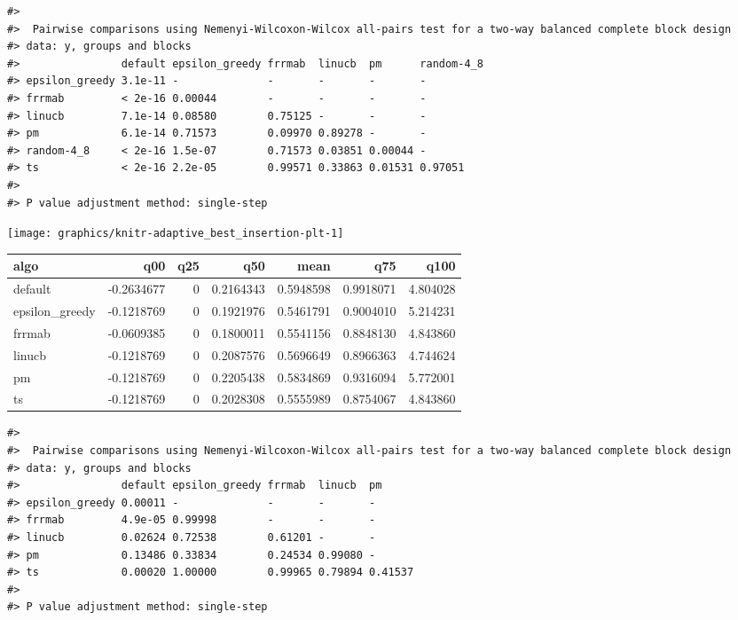\documentclass[
]{article}
\begin{document}
\begin{verbatim}
#> 
#>  Pairwise comparisons using Nemenyi-Wilcoxon-Wilcox all-pairs test for a two-way balanced complete block design
#> data: y, groups and blocks
#>                default epsilon_greedy frrmab  linucb  pm      random-4_8
#> epsilon_greedy 3.1e-11 -              -       -       -       -         
#> frrmab         < 2e-16 0.00044        -       -       -       -         
#> linucb         7.1e-14 0.08580        0.75125 -       -       -         
#> pm             6.1e-14 0.71573        0.09970 0.89278 -       -         
#> random-4_8     < 2e-16 1.5e-07        0.71573 0.03851 0.00044 -         
#> ts             < 2e-16 2.2e-05        0.99571 0.33863 0.01531 0.97051
#> 
#> P value adjustment method: single-step
\end{verbatim}

\begin{center}\texttt{[image: graphics/knitr-adaptive\_best\_insertion-plt-1]} \end{center}

\begin{longtable}[]{@{}lrrrrrr@{}}
\toprule
algo & q00 & q25 & q50 & mean & q75 & q100 \\
\midrule
\endhead
default & -0.2634677 & 0 & 0.2164343 & 0.5948598 & 0.9918071 &
4.804028 \\
epsilon\_greedy & -0.1218769 & 0 & 0.1921976 & 0.5461791 & 0.9004010 &
5.214231 \\
frrmab & -0.0609385 & 0 & 0.1800011 & 0.5541156 & 0.8848130 &
4.843860 \\
linucb & -0.1218769 & 0 & 0.2087576 & 0.5696649 & 0.8966363 &
4.744624 \\
pm & -0.1218769 & 0 & 0.2205438 & 0.5834869 & 0.9316094 & 5.772001 \\
ts & -0.1218769 & 0 & 0.2028308 & 0.5555989 & 0.8754067 & 4.843860 \\
\bottomrule
\end{longtable}

\begin{verbatim}
#> 
#>  Pairwise comparisons using Nemenyi-Wilcoxon-Wilcox all-pairs test for a two-way balanced complete block design
#> data: y, groups and blocks
#>                default epsilon_greedy frrmab  linucb  pm     
#> epsilon_greedy 0.00011 -              -       -       -      
#> frrmab         4.9e-05 0.99998        -       -       -      
#> linucb         0.02624 0.72538        0.61201 -       -      
#> pm             0.13486 0.33834        0.24534 0.99080 -      
#> ts             0.00020 1.00000        0.99965 0.79894 0.41537
#> 
#> P value adjustment method: single-step
\end{verbatim}
\end{document}
